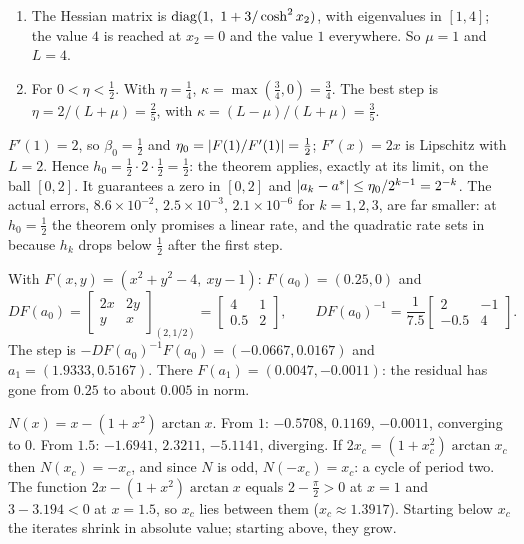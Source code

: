 \begin{enumerate}[nosep]
  \item The Hessian matrix is $\operatorname{diag}(1,\ 1 + 3/\cosh^2x_2)$, with
        eigenvalues in $[1, 4]$; the value $4$ is reached at $x_2 = 0$
        and the value $1$ everywhere. So $\mu = 1$ and $L = 4$.
  \item For $0 < \eta < \frac12$. With $\eta = \frac14$,
        $\kappa = \max(\frac34, 0) = \frac34$. The best step is
        $\eta = 2/(L + \mu) = \frac25$, with
        $\kappa = (L - \mu)/(L + \mu) = \frac35$.
\end{enumerate}

$F'(1) = 2$, so $\beta_0 = \frac12$ and
$\eta_0 = \left|F(1)/F'(1)\right| = \frac12$; $F'(x) = 2x$ is Lipschitz with
$L = 2$. Hence $h_0 = \frac12\cdot2\cdot\frac12 = \frac12$: the theorem
applies, exactly at its limit, on the ball $[0, 2]$. It guarantees a zero
in $[0, 2]$ and $\left|a_k - a^*\right|\leq\eta_0/2^{k-1} = 2^{-k}$. The actual
errors, $8.6\times10^{-2}$, $2.5\times10^{-3}$, $2.1\times10^{-6}$ for
$k = 1, 2, 3$, are far smaller: at $h_0 = \frac12$ the theorem only
promises a linear rate, and the quadratic rate sets in because $h_k$
drops below $\frac12$ after the first step.

With $F(x, y) = (x^2 + y^2 - 4,\ xy - 1)$: $F(a_0) = (0.25, 0)$ and
\[
  DF(a_0) = \begin{bmatrix}2x & 2y\\y & x\end{bmatrix}_{(2, 1/2)}
  = \begin{bmatrix}4 & 1\\0.5 & 2\end{bmatrix},
  \qquad
  DF(a_0)^{-1} = \frac1{7.5}\begin{bmatrix}2 & -1\\-0.5 & 4\end{bmatrix} .
\]
The step is $-DF(a_0)^{-1}F(a_0) = (-0.0667, 0.0167)$ and
$a_1 = (1.9333, 0.5167)$. There $F(a_1) = (0.0047, -0.0011)$: the residual
has gone from $0.25$ to about $0.005$ in norm.

$N(x) = x - (1 + x^2)\arctan x$. From $1$: $-0.5708$, $0.1169$,
$-0.0011$, converging to $0$. From $1.5$: $-1.6941$, $2.3211$,
$-5.1141$, diverging. If $2x_c = (1 + x_c^2)\arctan x_c$ then
$N(x_c) = -x_c$, and since $N$ is odd, $N(-x_c) = x_c$: a cycle of period
two. The function $2x - (1 + x^2)\arctan x$ equals
$2 - \frac\pi2 > 0$ at $x = 1$ and $3 - 3.194 < 0$ at $x = 1.5$, so
$x_c$ lies between them ($x_c\approx1.3917$). Starting below $x_c$ the
iterates shrink in absolute value; starting above, they grow.

